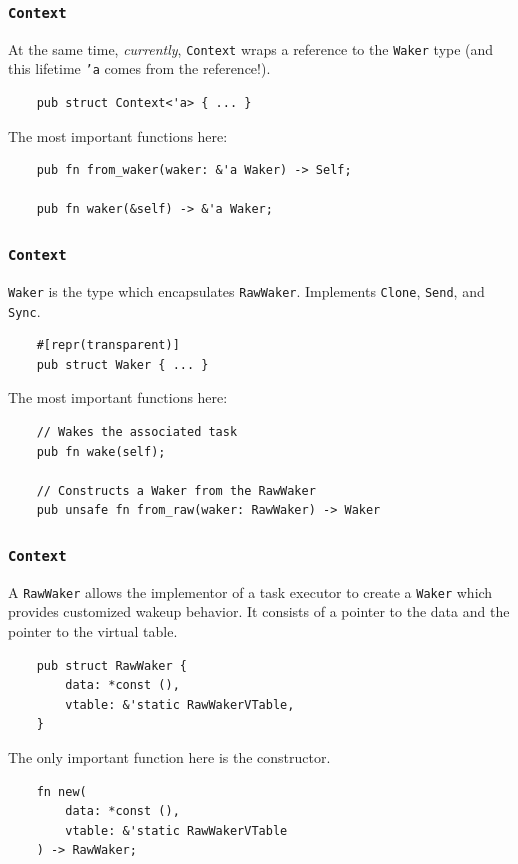 \documentclass[aspectratio=1610,t]{beamer}
\begin{document}

\begin{frame}[fragile]
\frametitle{\texttt{Context}}
At the same time, \textit{currently}, \texttt{Context} wraps a reference to the \texttt{Waker} type (and this lifetime \texttt{'a} comes from the reference!).

\begin{verbatim}
    pub struct Context<'a> { ... }
\end{verbatim}

The most important functions here:

\begin{verbatim}
    pub fn from_waker(waker: &'a Waker) -> Self;

    pub fn waker(&self) -> &'a Waker;
\end{verbatim}
\end{frame}


\begin{frame}[fragile]
\frametitle{\texttt{Context}}
\texttt{Waker} is the type which encapsulates \texttt{RawWaker}. Implements \texttt{Clone}, \texttt{Send}, and \texttt{Sync}.

\begin{verbatim}
    #[repr(transparent)]
    pub struct Waker { ... }
\end{verbatim}

The most important functions here:

\begin{verbatim}
    // Wakes the associated task
    pub fn wake(self);

    // Constructs a Waker from the RawWaker
    pub unsafe fn from_raw(waker: RawWaker) -> Waker
\end{verbatim}
\end{frame}


\begin{frame}[fragile]
\frametitle{\texttt{Context}}
A \texttt{RawWaker} allows the implementor of a task executor to create a \texttt{Waker} which provides customized wakeup behavior. It consists of a pointer to the data and the pointer to the virtual table.

\begin{verbatim}
    pub struct RawWaker {
        data: *const (),
        vtable: &'static RawWakerVTable,
    }
\end{verbatim}

The only important function here is the constructor.

\begin{verbatim}
    fn new(
        data: *const (),
        vtable: &'static RawWakerVTable
    ) -> RawWaker;
\end{verbatim}
\end{frame}
\end{document}

